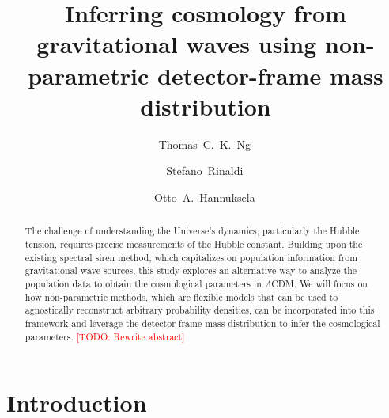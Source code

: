 \documentclass[aps,prd,twocolumn,superscriptaddress,preprintnumbers,nofootinbib,hidelinks]{revtex4-2}
\newcommand{\todo}[1]{\textcolor{red}{[TODO: #1]}}
\begin{document}
\title{Inferring cosmology from gravitational waves using non-parametric detector-frame mass distribution}

\author{Thomas~C.~K.~Ng\,}

\author{Stefano~Rinaldi\,}

\author{Otto~A.~Hannuksela\,}

\begin{abstract}
    The challenge of understanding the Universe's dynamics, particularly the Hubble tension, requires precise measurements of the Hubble constant.
    Building upon the existing spectral siren method, which capitalizes on population information from gravitational wave sources, this study explores an alternative way to analyze the population data to obtain the cosmological parameters in $\Lambda$CDM.
    We will focus on how non-parametric methods, which are flexible models that can be used to agnostically reconstruct arbitrary probability densities, can be incorporated into this framework and leverage the detector-frame mass distribution to infer the cosmological parameters.
    \todo{Rewrite abstract}
\end{abstract}

\maketitle

\begin{acronym}
\end{acronym}

\section{Introduction}
\label{sec:introduction}
\end{document}
